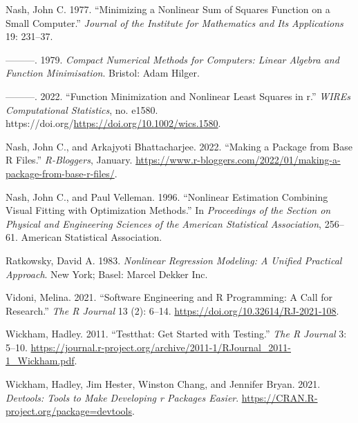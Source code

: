 \documentclass[
]{article}
\newlength{\cslhangindent}
\newlength{\cslentryspacingunit} %
\newenvironment{CSLReferences}[2] %
 {%
  \setlength{\parindent}{0pt}
  \ifodd #1
  \let\oldpar\par
  \def\par{\hangindent=\cslhangindent\oldpar}
  \fi
  \setlength{\parskip}{#2\cslentryspacingunit}
 }%
 {}
\begin{document}
\begin{CSLReferences}{1}{0}
\leavevmode{}%
Nash, John C. 1977. {``Minimizing a Nonlinear Sum of Squares Function on
a Small Computer.''} \emph{Journal of the Institute for Mathematics and
Its Applications} 19: 231--37.

\leavevmode{}%
---------. 1979. \emph{Compact Numerical Methods for Computers: Linear
Algebra and Function Minimisation}. Bristol: Adam Hilger.

\leavevmode{}%
---------. 2022. {``Function Minimization and Nonlinear Least Squares in
r.''} \emph{WIREs Computational Statistics}, no. e1580.
https://doi.org/\url{https://doi.org/10.1002/wics.1580}.

\leavevmode{}%
Nash, John C., and Arkajyoti Bhattacharjee. 2022. {``Making a Package
from Base {R} Files.''} \emph{R-Bloggers}, January.
\url{https://www.r-bloggers.com/2022/01/making-a-package-from-base-r-files/}.

\leavevmode{}%
Nash, John C., and Paul Velleman. 1996. {``Nonlinear Estimation
Combining Visual Fitting with Optimization Methods.''} In
\emph{Proceedings of the Section on Physical and Engineering Sciences of
the American Statistical Association}, 256--61. American Statistical
Association.

\leavevmode{}%
Ratkowsky, David A. 1983. \emph{Nonlinear Regression Modeling: A Unified
Practical Approach}. New York; Basel: Marcel Dekker Inc.

\leavevmode{}%
Vidoni, Melina. 2021. {``{Software Engineering and R Programming: A Call
for Research}.''} \emph{{The R Journal}} 13 (2): 6--14.
\url{https://doi.org/10.32614/RJ-2021-108}.

\leavevmode{}%
Wickham, Hadley. 2011. {``Testthat: Get Started with Testing.''}
\emph{The R Journal} 3: 5--10.
\url{https://journal.r-project.org/archive/2011-1/RJournal_2011-1_Wickham.pdf}.

\leavevmode{}%
Wickham, Hadley, Jim Hester, Winston Chang, and Jennifer Bryan. 2021.
\emph{Devtools: Tools to Make Developing r Packages Easier}.
\url{https://CRAN.R-project.org/package=devtools}.

\end{CSLReferences}
\end{document}

